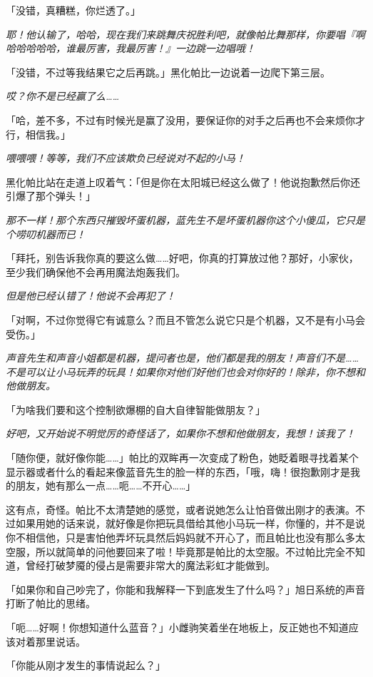 「没错，真糟糕，你烂透了。」

\emph{耶！他认输了，哈哈，现在我们来跳舞庆祝胜利吧，就像帕比舞那样，你要唱『啊哈哈哈哈哈，谁最厉害，我最厉害！』一边跳一边唱哦！}

「没错，不过等我结果它之后再跳。」黑化帕比一边说着一边爬下第三层。

\emph{哎？你不是已经赢了么……}

「哈，差不多，不过有时候光是赢了没用，要保证你的对手之后再也不会来烦你才行，相信我。」

\emph{喂喂喂！等等，我们不应该欺负已经说对不起的小马！}

黑化帕比站在走道上叹着气：「但是你在太阳城已经这么做了！他说抱歉然后你还引爆了那个弹头！」

\emph{那不一样！那个东西只摧毁坏蛋机器，蓝先生不是坏蛋机器你这个小傻瓜，它只是个唠叨机器而已！}

「拜托，别告诉我你真的要这么做……好吧，你真的打算放过他？那好，小家伙，至少我们确保他不会再用魔法炮轰我们。

\emph{但是他已经认错了！他说不会再犯了！}

「对啊，不过你觉得它有诚意么？而且不管怎么说它只是个机器，又不是有小马会受伤。」

\emph{声音先生和声音小姐都是机器，提问者也是，他们都是我的朋友！声音们不是……不是可以让小马玩弄的玩具！如果你对他们好他们也会对你好的！除非，你不想和他做朋友。}

「为啥我们要和这个控制欲爆棚的自大自律智能做朋友？」

\emph{好吧，又开始说不明觉厉的奇怪话了，如果你不想和他做朋友，我想！该我了！}

「随你便，就好像你能……」帕比的双眸再一次变成了粉色，她眨着眼寻找着某个显示器或者什么的看起来像蓝音先生的脸一样的东西，「哦，嗨！很抱歉刚才是我的朋友，她有那么一点……呃……不开心……」

这有点，奇怪。帕比不太清楚她的感觉，或者说她怎么让怕音做出刚才的表演。不过如果用她的话来说，就好像是你把玩具借给其他小马玩一样，你懂的，并不是说你不相信他，只是害怕他弄坏玩具然后妈妈就不开心了，而且帕比也没有那么多太空服，所以就简单的问他要回来了啦！毕竟那是帕比的太空服。不过帕比完全不知道，曾经打破梦魇的侵占是需要非常大的魔法彩虹才能做到。

「如果你和自己吵完了，你能和我解释一下到底发生了什么吗？」旭日系统的声音打断了帕比的思绪。

「呃……好啊！你想知道什么蓝音？」小雌驹笑着坐在地板上，反正她也不知道应该对着那里说话。

「你能从刚才发生的事情说起么？」

